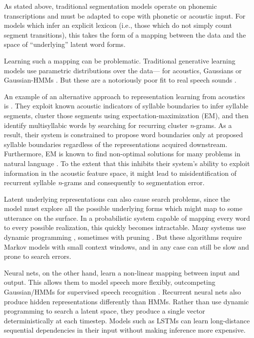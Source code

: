 \documentclass[11pt,letterpaper]{article}
\begin{document}
As stated above, traditional segmentation models operate on phonemic
transcriptions and must be adapted to cope with phonetic or acoustic
input. For models which infer an explicit lexicon (i.e., those which
do not simply count segment transitions), this takes the form of a mapping
between the data and the space of ``underlying'' latent word
forms.

Learning such a mapping can be problematic. Traditional generative
learning models use parametric distributions over the data--- for
acoustics, Gaussians \cite{Vallabha07,Feldman09} or Gaussian-HMMs
\cite{Lee12,Lee15}. But these are a notoriously poor fit to real speech sounds
\cite{Glass03}.

An example of an alternative approach to representation learning from acoustics is .
They exploit known acoustic indicators of syllable boundaries to infer syllable segments, cluster those segments using expectation-maximization (EM), and then identify multisyllabic words by searching for recurring cluster \textit{n}-grams.
As a result, their system is constrained to propose word boundaries only at proposed syllable boundaries regardless of the representations acquired downstream.
Furthermore, EM is known to find non-optimal solutions for many problems in natural language \cite{Johnson07}.
To the extent that this inhibits their system's ability to exploit information in the acoustic feature space, it might lead to misidentification of recurrent syllable \textit{n}-grams and consequently to segmentation error.

Latent underlying representations can also cause search problems,
since the model must explore all the possible underlying forms which
might map to some utterance on the surface. In a probabilistic system
capable of mapping every word to every possible realization, this
quickly becomes intractable. Many systems use dynamic programming
\cite{Mochihashi09,Neubig10}, sometimes with pruning
\cite{vanGael08}. But these algorithms require Markov models with
small context windows, and in any case can still be slow and prone to
search errors.

Neural nets, on the other hand, learn a non-linear mapping between
input and output. This allows them to model speech more flexibly,
outcompeting Gaussian/HMMs for supervised speech recognition
\cite{Graves13,Hinton12}. Recurrent neural nets also produce hidden
representations differently than HMMs. Rather than use dynamic
programming to search a latent space, they produce a single vector
deterministically at each timestep. Models such as LSTMs
\cite{Hochreiter97} can learn long-distance sequential dependencies in
their input without making inference more expensive.
\end{document}
